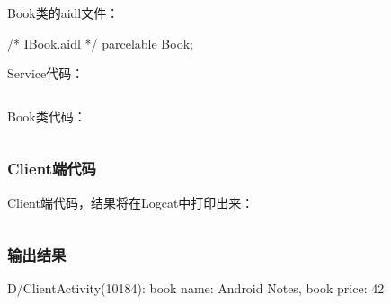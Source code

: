 ﻿\documentclass[a4paper,11pt]{article}
\begin{document}
  Book类的aidl文件：\par
  \begin{javacode}
/* IBook.aidl */
parcelable Book;
  \end{javacode}

  Service代码：\par
  \inputminted[linenos,tabsize=4,bgcolor=srcbg]{java}{AIDLServerService.java}

  Book类代码：\par
  \inputminted[linenos,tabsize=4,bgcolor=srcbg]{java}{Book.java}

  \subsubsection[Client端代码]{Client端代码}
  Client端代码，结果将在Logcat中打印出来：\par
  \inputminted[linenos,tabsize=4,bgcolor=srcbg]{java}{ClientActivity.java}

  \subsubsection[输出结果]{输出结果}
  \begin{bashcode}
D/ClientActivity(10184): book name: Android Notes, book price: 42
  \end{bashcode}
  
\end{document}
